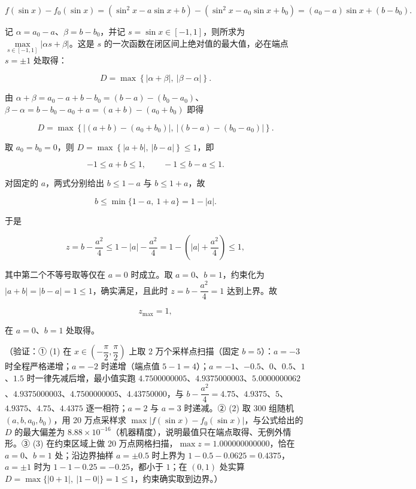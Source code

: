 \begin{answer}
\nopagebreak[4]
\[
f(\sin x)-f_0(\sin x)=\left(\sin^2 x-a\sin x+b\right)-\left(\sin^2 x-a_0\sin x+b_0\right)=(a_0-a)\sin x+(b-b_0).
\]

记 \(\alpha=a_0-a\)、\(\beta=b-b_0\)，并记 \(s=\sin x\in[-1,1]\)，则所求为 \(\max\limits_{s\in[-1,1]}|\alpha s+\beta|\)。这是 \(s\) 的一次函数在闭区间上绝对值的最大值，必在端点 \(s=\pm 1\) 处取得：

\nopagebreak[4]
\[
D=\max\left\{|\alpha+\beta|,\ |\beta-\alpha|\right\}.
\]

由 \(\alpha+\beta=a_0-a+b-b_0=(b-a)-(b_0-a_0)\)、\(\beta-\alpha=b-b_0-a_0+a=(a+b)-(a_0+b_0)\) 即得

\nopagebreak[4]
\[
D=\max\left\{\left|(a+b)-(a_0+b_0)\right|,\ \left|(b-a)-(b_0-a_0)\right|\right\}.
\]


取 \(a_0=b_0=0\)，则 \(D=\max\left\{|a+b|,\ |b-a|\right\}\leqslant 1\)，即

\nopagebreak[4]
\[
-1\leqslant a+b\leqslant 1,\qquad -1\leqslant b-a\leqslant 1 .
\]

对固定的 \(a\)，两式分别给出 \(b\leqslant 1-a\) 与 \(b\leqslant 1+a\)，故

\nopagebreak[4]
\[
b\leqslant\min\{1-a,\ 1+a\}=1-|a| .
\]

于是

\nopagebreak[4]
\[
z=b-\dfrac{a^2}{4}\leqslant 1-|a|-\dfrac{a^2}{4}=1-\left(|a|+\dfrac{a^2}{4}\right)\leqslant 1,
\]

其中第二个不等号取等仅在 \(a=0\) 时成立。取 \(a=0\)、\(b=1\)，约束化为 \(|a+b|=|b-a|=1\leqslant 1\)，确实满足，且此时 \(z=b-\dfrac{a^2}{4}=1\) 达到上界。故

\nopagebreak[4]
\[
z_{\max}=1,
\]

在 \(a=0\)、\(b=1\) 处取得。

（验证：① (1) 在 \(x\in\left(-\dfrac{\pi}{2},\dfrac{\pi}{2}\right)\) 上取 2 万个采样点扫描（固定 \(b=5\)）：\(a=-3\) 时全程严格递增；\(a=-2\) 时递增（端点值 \(5-1=4\)）；\(a=-1\)、\(-0.5\)、\(0\)、\(0.5\)、\(1\)、\(1.5\) 时一律先减后增，最小值实跑 \(4.7500000005\)、\(4.9375000003\)、\(5.0000000062\)、\(4.9375000003\)、\(4.7500000005\)、\(4.43750000\)，与 \(b-\dfrac{a^2}{4}=4.75\)、\(4.9375\)、\(5\)、\(4.9375\)、\(4.75\)、\(4.4375\) 逐一相符；\(a=2\) 与 \(a=3\) 时递减。② (2) 取 300 组随机 \((a,b,a_0,b_0)\)，用 20 万点采样求 \(\max|f(\sin x)-f_0(\sin x)|\)，与公式给出的 \(D\) 的最大偏差为 \(8.88\times 10^{-16}\)（机器精度），说明最值只在端点取得、无例外情形。③ (3) 在约束区域上做 20 万点网格扫描，\(\max z=1.000000000000\)，恰在 \(a=0\)、\(b=1\) 处；沿边界抽样 \(a=\pm 0.5\) 时上界为 \(1-0.5-0.0625=0.4375\)，\(a=\pm 1\) 时为 \(1-1-0.25=-0.25\)，都小于 \(1\)；在 \((0,1)\) 处实算 \(D=\max\{|0+1|,\ |1-0|\}=1\leqslant 1\)，约束确实取到边界。）


\end{answer}
